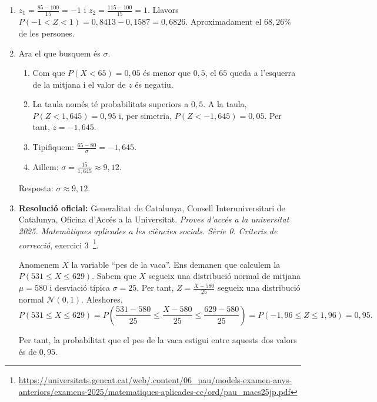 \begin{enumerate}
 \item $z_1=\frac{85-100}{15}=-1$ i $z_2=\frac{115-100}{15}=1$. Llavors $P(-1<Z<1)=0{,}8413-0{,}1587=0{,}6826$. Aproximadament el $68{,}26\%$ de les persones.

 \item Ara el que busquem és $\sigma$.
 \begin{enumerate}[(1)]
  \item Com que $P(X<65)=0{,}05$ és menor que $0{,}5$, el $65$ queda a l'esquerra de la mitjana i el valor de $z$ és negatiu.
  \item La taula només té probabilitats superiors a $0{,}5$. A la taula, $P(Z<1{,}645)=0{,}95$ i, per simetria, $P(Z<-1{,}645)=0{,}05$. Per tant, $z=-1{,}645$.
  \item Tipifiquem: $\frac{65-80}{\sigma}=-1{,}645$.
  \item Aïllem: $\sigma=\frac{15}{1{,}645}\approx9{,}12$.
 \end{enumerate}
 Resposta: $\sigma\approx9{,}12$.

 \item \textbf{Resolució oficial:} Generalitat de Catalunya, Consell Interuniversitari de Catalunya, Oficina d'Accés a la Universitat. \textit{Proves d'accés a la universitat 2025. Matemàtiques aplicades a les ciències socials. Sèrie 0. Criteris de correcció}, exercici 3~\footnote{\url{https://universitats.gencat.cat/web/.content/06_pau/models-examen-anys-anteriors/examens-2025/matematiques-aplicades-cc/ord/pau_macs25jp.pdf}}.

 Anomenem $X$ la variable ``pes de la vaca''. Ens demanen que calculem la $P(531 \leq X \leq 629)$. Sabem que $X$ segueix una distribució normal de mitjana $\mu = 580$ i desviació típica $\sigma = 25$. Per tant, $Z = \frac{X-580}{25}$ segueix una distribució normal $\mathcal{N}(0,1)$. Aleshores,
 $$P(531 \leq X \leq 629) = P\left(\frac{531-580}{25} \leq \frac{X-580}{25} \leq \frac{629-580}{25} \right) = P(-1{,}96 \leq Z \leq 1{,}96) = 0{,}95. $$

 Per tant, la probabilitat que el pes de la vaca estigui entre aquests dos valors és de $0{,}95$.
\end{enumerate}


